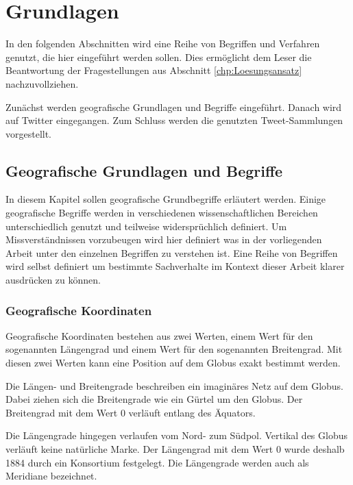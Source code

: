 \chapter{Grundlagen} \label{chp:Grundlagen}  
In den folgenden Abschnitten wird eine Reihe von Begriffen und Verfahren genutzt, die hier eingeführt werden sollen.     
Dies ermöglicht dem Leser die Beantwortung der Fragestellungen aus Abschnitt \ref{chp:Loesungsansatz} nachzuvollziehen.    
 
Zunächst werden geografische Grundlagen und Begriffe eingeführt. 
Danach wird auf Twitter eingegangen.   
Zum Schluss werden die genutzten Tweet-Sammlungen vorgestellt.

\newpage

	\section{Geografische Grundlagen und Begriffe}
	
		In diesem Kapitel sollen geografische Grundbegriffe erläutert werden. 
		Einige geografische Begriffe werden in verschiedenen wissenschaftlichen Bereichen unterschiedlich genutzt und teilweise widersprüchlich definiert. 
		Um Missverständnissen vorzubeugen wird hier definiert was in der vorliegenden Arbeit unter den einzelnen Begriffen zu verstehen ist.
		Eine Reihe von Begriffen wird selbst definiert um bestimmte Sachverhalte im Kontext dieser Arbeit klarer ausdrücken zu können. 

		\subsection{Geografische Koordinaten}
			
			Geografische Koordinaten bestehen aus zwei Werten, einem Wert für den sogenannten Längengrad und einem Wert für den sogenannten Breitengrad.
			Mit diesen zwei Werten kann eine Position auf dem Globus exakt bestimmt werden.  
			
			Die Längen- und Breitengrade beschreiben ein imaginäres Netz auf dem Globus. 
			Dabei ziehen sich die Breitengrade wie ein Gürtel um den Globus.
			Der Breitengrad mit dem Wert 0 verläuft entlang des Äquators.

			Die Längengrade hingegen verlaufen vom Nord- zum Südpol. 
			Vertikal des Globus verläuft keine natürliche Marke. 
			Der Längengrad mit dem Wert 0 wurde deshalb 1884 durch ein Konsortium festgelegt.
			Die Längengrade werden auch als Meridiane bezeichnet.
			
